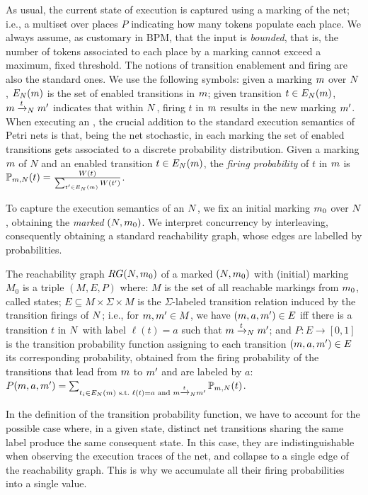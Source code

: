 As usual, the current state of execution is captured using a marking of the net; i.e., a multiset over places $P$ indicating how 
many tokens populate each place. We always assume, as customary in BPM, that the input \uswn is \emph{bounded}, that is, 
the number of tokens associated to each place by a marking cannot exceed a maximum, fixed threshold.
%
The notions of transition enablement and firing are also the standard ones. We use the following symbols: given a marking 
$m$ over $N$, $E_{N}(m)$ is the set of enabled transitions in $m$; given transition 
$t \in E_{N}(m)$, $m\xrightarrow{t}_{N}m'$ indicates that within $N$, firing $t$ in $m$ 
results in the new marking $m'$. When executing an \uswn, the crucial addition to the standard execution semantics of 
Petri nets is that, being the net stochastic, in each marking the set of enabled transitions gets associated to a discrete 
probability distribution. Given a marking $m$ of $N$ and an enabled transition $t \in E_{N}(m)$, the 
\emph{firing probability} of $t$ in $m$ is $\mathbb{P}_{m,N}(t) = \frac{W(t)}{\sum_{t'\in E_{N}(m)}W(t')}$.

To capture the execution semantics of an \uswn $N$, we fix an initial marking $m_0$ over $N$, obtaining the \emph{marked} \uswn $(N,m_0)$. We interpret concurrency by interleaving, consequently obtaining a standard reachability graph, whose edges are labelled by probabilities.


\begin{definition}
The reachability graph $RG(N,m_0)$ of a marked \uswn $(N,m_0)$ with (initial) marking $M_0$ is a triple $(M,E,P)$ where:
	$M$ is the set of all reachable markings from $m_0$, called states;
	$E \subseteq M \times \Sigma \times M$ is the $\Sigma$-labeled transition relation induced by the transition firings of $N$; 
	 i.e., for $m,m' \in M$, we have $(m,a,m') \in E$ iff there is a transition $t$ in $N$ with label 
	 $\ell(t) = a$ such that $m\xrightarrow{t}_{N}m'$; and
	$P:E \rightarrow [0,1]$ is the transition probability function assigning to each transition $(m,a,m') \in E$ its
	 corresponding probability, obtained from the firing probability of the transitions that lead from $m$ to 
	 $m'$ and are labeled by $a$: 
	 $P(m,a,m') = \sum_{t_i \in E_{N}(m) \text{ s.t.~} \ell(t) = a \text{ and } m\xrightarrow{t}_{N}m'} \mathbb{P}_{m,N}(t)$.
\end{definition}
%
In the definition of the transition probability function, we have to account for the possible case where, in a given state, distinct 
net transitions sharing the same label produce the same consequent state. In this case, they are indistinguishable when 
observing the execution traces of the net, and collapse to a single edge of the reachability graph. This is why we accumulate 
all their firing probabilities into a single value.

